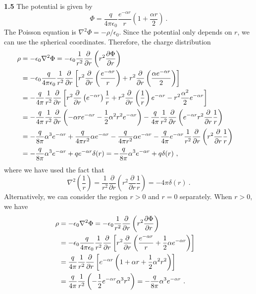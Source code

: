 \documentclass[12pt]{article}
\begin{document}
\newpage
\noindent\textbf{1.5} The potential is given by
$$
\Phi = \frac{q}{4\pi \epsilon_0} \frac{e^{-\alpha r}}{r} \left( 1 + \frac{\alpha r}{2}\right)~.
$$
The Poisson equation is $\nabla^2 \Phi = - \rho / \epsilon_0$. Since the potential only depends on $r$, we can use the spherical coordinates. Therefore, the charge distribution
\begin{align}
    \rho &= -\epsilon_0 \nabla^2 \Phi = -\epsilon_0 \frac{1}{r^2} \frac{\partial }{\partial r } \left(r^2 \frac{\partial \Phi }{\partial r } \right) \cr
    &= -\epsilon_0  \frac{q}{4\pi \epsilon_0}\frac{1}{r^2} \frac{\partial }{\partial r}\left[ r^2 \frac{\partial }{\partial r}\left(\frac{e^{-\alpha r}}{r}\right)  + r^2 \frac{\partial }{\partial r}\left(\frac{\alpha e^{-\alpha r}}{2}\right)\right]\cr
    &=-\frac{q}{4\pi} \frac{1}{r^2} \frac{\partial}{\partial r} \left[r^2\frac{\partial }{\partial r}\left(e^{-\alpha r}\right) \frac1r + r^2 \frac{\partial }{\partial r} \left(\frac{1}{r}\right) e^{-\alpha r} - r^2 \frac{\alpha^2}{2}e^{-\alpha r} \right]\cr
    &=-\frac{q}{4\pi} \frac{1}{r^2} \frac{\partial}{\partial r} \left(-\alpha r e^{-\alpha r} -\frac12 \alpha^2 r^2 e^{-\alpha r}\right) - \frac{q}{4\pi} \frac{1}{r^2} \frac{\partial}{\partial r}\left(e^{-\alpha r} r^2 \frac{\partial }{\partial r}\frac{1}{r}\right)\cr
    &=-\frac{q}{8 \pi} \alpha^3 e^{-\alpha r} + \frac{q}{4\pi r^2} \alpha e^{-\alpha r} - \frac{q}{4\pi r^2} \alpha e^{-\alpha r} - \frac{q}{4\pi} e^{-\alpha r} \frac{1}{r^2}  \frac{\partial }{\partial r} \left(r^2 \frac{\partial }{\partial r} \frac 1r\right)\cr
    &= - \frac{q}{8 \pi} \alpha^3 e^{-\alpha r} + q e^{-\alpha r} \delta(r) = - \frac{q}{8 \pi} \alpha^3 e^{-\alpha r} + q \delta(r)~,
\end{align}
where we have used the fact that
\begin{equation}
    \nabla^2\left(\frac{1}{r}\right) = \frac{1}{r^2} \frac{\partial}{\partial r}\left(r^2 \frac{\partial}{\partial r} \frac 1r \right) = - 4\pi \delta(r)~.
\end{equation}
\iffalse
Alternatively, we can consider the region $r > 0$ and $r = 0$ separately. When $r > 0$, we have
\begin{align}
    \rho &= - \epsilon_0 \nabla^2 \Phi = -\epsilon_0 \frac{1}{r^2} \frac{\partial }{\partial r } \left(r^2 \frac{\partial \Phi }{\partial r } \right) \cr
    &= - \epsilon_0 \frac{q}{4\pi \epsilon_0}\frac{1}{r^2}\frac{\partial}{\partial r} \left[r^2 \frac{\partial }{\partial r} \left( \frac{e^{-\alpha r}}{r} + \frac12 \alpha e^{-\alpha r} \right) \right] \cr
    &= \frac{q}{4 \pi} \frac{1}{r^2} \frac{\partial }{\partial r} \left[ e^{-\alpha r} \left( 1 + \alpha r + \frac12 \alpha^2 r^2 \right) \right] \cr
    &= \frac{q}{4\pi} \frac{1}{r^2} \left( - \frac12 e^{-\alpha r} \alpha^3 r^2 \right) = - \frac{q}{8 \pi} \alpha^3 e^{-\alpha r}~.
\end{align}
\end{document}
